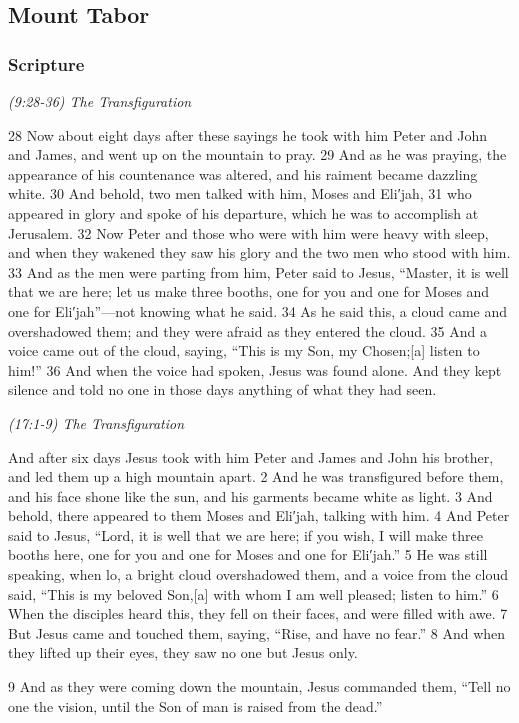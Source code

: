 \documentclass[letterpaper]{report}
\begin{document}
\clearpage
\subsection{ Mount Tabor}
\begin{multicols}{2}
	\mbox{}
\end{multicols}
\subsubsection{Scripture}

{\centering
	\emph{(9:28-36) The Transfiguration}\\
}
\begin{multicols}{2}
28 Now about eight days after these sayings he took with him Peter and John and James, and went up on the mountain to pray. 29 And as he was praying, the appearance of his countenance was altered, and his raiment became dazzling white. 30 And behold, two men talked with him, Moses and Eli′jah, 31 who appeared in glory and spoke of his departure, which he was to accomplish at Jerusalem. 32 Now Peter and those who were with him were heavy with sleep, and when they wakened they saw his glory and the two men who stood with him. 33 And as the men were parting from him, Peter said to Jesus, “Master, it is well that we are here; let us make three booths, one for you and one for Moses and one for Eli′jah”—not knowing what he said. 34 As he said this, a cloud came and overshadowed them; and they were afraid as they entered the cloud. 35 And a voice came out of the cloud, saying, “This is my Son, my Chosen;[a] listen to him!” 36 And when the voice had spoken, Jesus was found alone. And they kept silence and told no one in those days anything of what they had seen.
\end{multicols}

{\centering
	\emph{(17:1-9) The Transfiguration}\\
}
\begin{multicols}{2}
And after six days Jesus took with him Peter and James and John his brother, and led them up a high mountain apart. 2 And he was transfigured before them, and his face shone like the sun, and his garments became white as light. 3 And behold, there appeared to them Moses and Eli′jah, talking with him. 4 And Peter said to Jesus, “Lord, it is well that we are here; if you wish, I will make three booths here, one for you and one for Moses and one for Eli′jah.” 5 He was still speaking, when lo, a bright cloud overshadowed them, and a voice from the cloud said, “This is my beloved Son,[a] with whom I am well pleased; listen to him.” 6 When the disciples heard this, they fell on their faces, and were filled with awe. 7 But Jesus came and touched them, saying, “Rise, and have no fear.” 8 And when they lifted up their eyes, they saw no one but Jesus only.

9 And as they were coming down the mountain, Jesus commanded them, “Tell no one the vision, until the Son of man is raised from the dead.”
\end{multicols}
\end{document}
